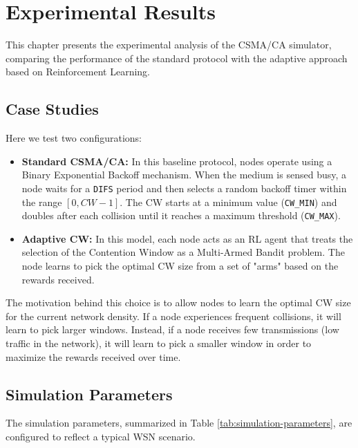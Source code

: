\chapter{Experimental Results}
This chapter presents the experimental analysis of the CSMA/CA simulator, comparing the performance of the standard protocol with the adaptive approach based on Reinforcement Learning.

\section{Case Studies}
Here we test two configurations:
\begin{itemize}
    \item \textbf{Standard CSMA/CA:} In this baseline protocol, nodes operate using a Binary Exponential Backoff mechanism. When the medium is sensed busy, a node waits for a \texttt{DIFS} period and then selects a random backoff timer within the range $[0,CW-1]$. The CW starts at a minimum value (\texttt{CW\_MIN}) and doubles after each collision until it reaches a maximum threshold (\texttt{CW\_MAX}).
    \item \textbf{Adaptive CW:} In this model, each node acts as an RL agent that treats the selection of the Contention Window as a Multi-Armed Bandit problem. The node learns to pick the optimal CW size from a set of "arms" based on the rewards received.
\end{itemize}

The motivation behind this choice is to allow nodes to learn the optimal CW size for the current network density. If a node experiences frequent collisions, it will learn to pick larger windows. Instead, if a node receives few transmissions (low traffic in the network), it will learn to pick a smaller window in order to maximize the rewards received over time.

\section{Simulation Parameters}
The simulation parameters, summarized in Table \ref{tab:simulation-parameters}, are configured to reflect a typical WSN scenario.

